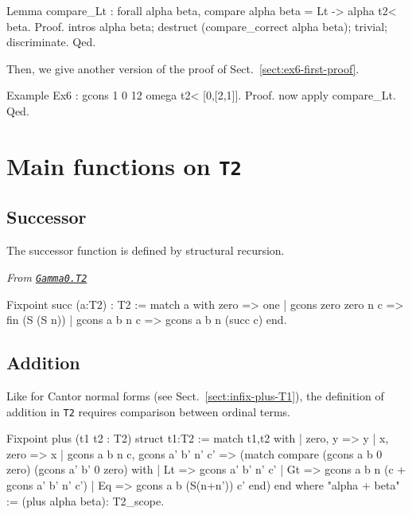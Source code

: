 {\begin{remark}
\begin{Coqsrc}
Lemma compare_Lt : forall alpha beta, compare alpha beta = Lt -> 
                                         alpha t2< beta.
Proof.
  intros alpha beta; destruct (compare_correct alpha beta);
    trivial; discriminate. 
Qed.
\end{Coqsrc}

Then, we give another version of the proof of Sect.~\vref{sect:ex6-first-proof}.

\begin{Coqsrc}
Example Ex6 : gcons 1 0 12 omega t2< [0,[2,1]].
Proof. now apply compare_Lt. Qed.
\end{Coqsrc}

\end{remark}


\section{Main functions on \texttt{T2}}

\subsection{Successor}
The successor function is defined by structural recursion.

\noindent\emph{From \href{../theories/html/hydras.Gamma0.T2.html\#succ}%
{\texttt{Gamma0.T2}}}
\begin{Coqsrc}
Fixpoint succ (a:T2) : T2 :=
 match a with zero => one
             | gcons zero zero n c => fin (S (S n))
             | gcons a b n c => gcons a b n (succ c)
 end.
\end{Coqsrc}

\subsection{Addition}

Like for Cantor normal forms (see Sect.~\ref{sect:infix-plus-T1}),  the definition of addition in \texttt{T2}  requires comparison between ordinal terms.


\begin{Coqsrc}
Fixpoint plus (t1 t2 : T2) {struct t1}:T2 :=
  match t1,t2 with
  |  zero, y  => y
  |  x, zero => x
  |  gcons a b n c, gcons a' b' n' c' =>
     (match compare (gcons a b 0 zero)
                    (gcons a' b' 0 zero) with
      | Lt => gcons a' b' n' c'
      | Gt => gcons a b n (c + gcons a' b' n' c')
      | Eq => gcons a b (S(n+n')) c'
      end)
  end
where "alpha + beta" := (plus alpha beta): T2_scope.
\end{Coqsrc}

}
